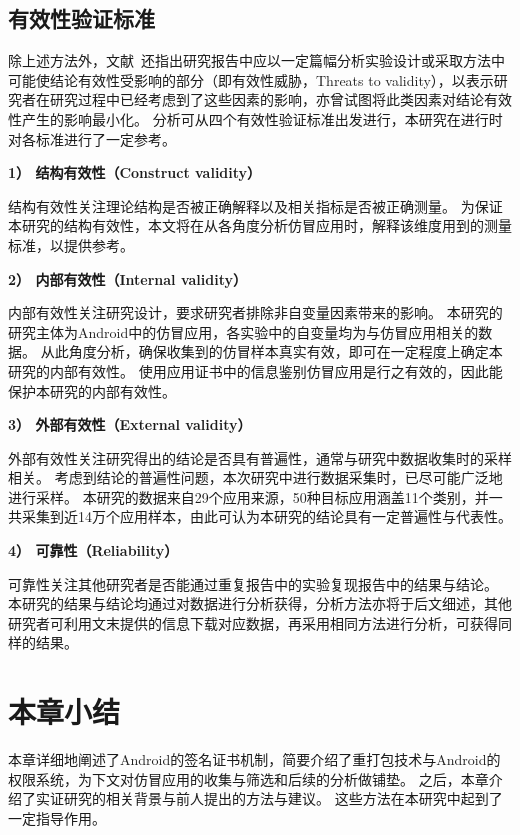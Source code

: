 \subsection{有效性验证标准}
除上述方法外，文献~\cite{easterbrook2008selecting}还指出研究报告中应以一定篇幅分析实验设计或采取方法中可能使结论有效性受影响的部分（即有效性威胁，Threats to validity），以表示研究者在研究过程中已经考虑到了这些因素的影响，亦曾试图将此类因素对结论有效性产生的影响最小化。
分析可从四个有效性验证标准出发进行，本研究在进行时对各标准进行了一定参考。

\textbf{1） 结构有效性（Construct validity）}

结构有效性关注理论结构是否被正确解释以及相关指标是否被正确测量。
为保证本研究的结构有效性，本文将在从各角度分析仿冒应用时，解释该维度用到的测量标准，以提供参考。

\textbf{2） 内部有效性（Internal validity）}

内部有效性关注研究设计，要求研究者排除非自变量因素带来的影响。
本研究的研究主体为Android中的仿冒应用，各实验中的自变量均为与仿冒应用相关的数据。
从此角度分析，确保收集到的仿冒样本真实有效，即可在一定程度上确定本研究的内部有效性。
使用应用证书中的信息鉴别仿冒应用是行之有效的，因此能保护本研究的内部有效性。

\textbf{3） 外部有效性（External validity）}

外部有效性关注研究得出的结论是否具有普遍性，通常与研究中数据收集时的采样相关。
考虑到结论的普遍性问题，本次研究中进行数据采集时，已尽可能广泛地进行采样。
本研究的数据来自29个应用来源，50种目标应用涵盖11个类别，并一共采集到近14万个应用样本，由此可认为本研究的结论具有一定普遍性与代表性。

\textbf{4） 可靠性（Reliability）}

可靠性关注其他研究者是否能通过重复报告中的实验复现报告中的结果与结论。
本研究的结果与结论均通过对数据进行分析获得，分析方法亦将于后文细述，其他研究者可利用文末提供的信息下载对应数据，再采用相同方法进行分析，可获得同样的结果。

\section{本章小结}
本章详细地阐述了Android的签名证书机制，简要介绍了重打包技术与Android的权限系统，为下文对仿冒应用的收集与筛选和后续的分析做铺垫。
之后，本章介绍了实证研究的相关背景与前人提出的方法与建议。
这些方法在本研究中起到了一定指导作用。

